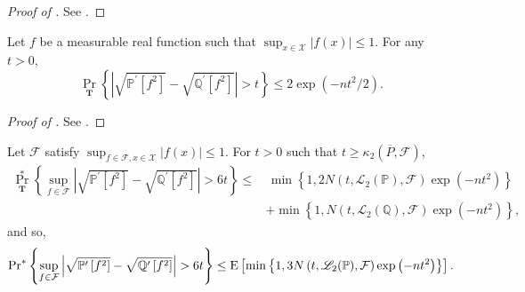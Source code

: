 \begin{proof}[Proof of ]
See .
\end{proof}

\begin{lemma}
\label{lem--sqrt-ep-2nd-moment-ratio-symm-single}
Let \(f\) be a measurable real function such that \(\sup_{x \in \mathcal{X}} |f
(x)| \leq 1\).
For any \(t > 0\),
\begin{equation}
  \Pr_{\mathbf{T}} \left\{ \left| \sqrt{\mathbb{P}^{\prime} \left[ f^{2}
  \right]} - \sqrt{\mathbb{Q}^{\prime} \left[ f^{2} \right]} \right| > t
  \right\} \leq 2 \exp \left( - n t^{2} / 2 \right).
  \label{eqn--sqrt-ep-2nd-moment-ratio-symm-single}
\end{equation}
\end{lemma}

\begin{proof}[Proof of ]
See .
\end{proof}

\begin{lemma}
\label{lem--sqrt-ep-2nd-moment-sup-symm-pbound}
Let \(\mathcal{F}\) satisfy \(\sup_{f \in \mathcal{F}, x \in \mathcal{X}} |f
(x)| \leq 1\).
For \(t > 0\) such that \(t \geq \kappa_{2} \left( \overline{P}, \mathcal{F}
\right)\),
\begin{equation}
  \begin{split}
    \Pr_{\mathbf{T}}^{\ast} \left\{ \sup_{f \in \mathcal{F}} \left|
    \sqrt{\mathbb{P}^{\prime} \left[ f^{2} \right]} - \sqrt{\mathbb{Q}^{\prime}
    \left[ f^{2} \right]} \right| > 6 t \right\} \leq
    & \, \min \left\{ 1, 2 N \left( t, \mathscr{L}_{2} (\mathbb{P}), \mathcal{F}
    \right) \exp \left( - n t^{2} \right) \right\} \\
    & + \min \left\{ 1, N \left( t, \mathscr{L}_{2} (\mathbb{Q}), \mathcal{F}
    \right) \exp \left( - n t^{2} \right) \right\},
  \end{split}
  \label{eqn--sqrt-ep-2nd-moment-sup-symm-pbound-conditional}
\end{equation}
and so,
\begin{equation}
  \mathrm{Pr}^{\ast} \left\{ \sup_{f \in \mathcal{F}} \left|
  \sqrt{\mathbb{P}^{\prime} \left[ f^{2} \right]} - \sqrt{\mathbb{Q}^{\prime}
  \left[ f^{2} \right]} \right| > 6 t \right\} \leq
  \mathrm{E} \left[  \min \left\{ 1, 3 N \left( t, \mathscr{L}_{2} (\mathbb{P}),
  \mathcal{F} \right) \exp \left( - n t^{2} \right) \right\} \right].
  \label{eqn--sqrt-ep-2nd-moment-sup-symm-pbound-1}
\end{equation}
\end{lemma}

